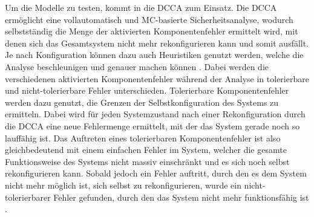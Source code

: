 Um die Modelle zu testen, kommt in \sS die \ac{DCCA} zum Einsatz. Die \ac{DCCA} ermöglicht eine vollautomatisch und \ac{MC}-basierte Sicherheitsanalyse, wodurch selbstständig die Menge der aktivierten Komponentenfehler ermittelt wird, mit denen sich das Gesamtsystem nicht mehr rekonfigurieren kann und somit ausfällt. Je nach Konfiguration können dazu auch Heuristiken genutzt werden, welche die Analyse beschleunigen und genauer machen können \cite{Eberhardinger2016}. Dabei werden die verschiedenen aktivierten Komponentenfehler während der Analyse in tolerierbare und nicht-tolerierbare Fehler unterschieden. Tolerierbare Komponentenfehler werden dazu genutzt, die Grenzen der Selbstkonfiguration des Systems zu ermitteln. Dabei wird für jeden Systemzustand nach einer Rekonfiguration durch die \ac{DCCA} eine neue Fehlermenge ermittelt, mit der das System gerade noch so lauffähig ist. Das Auftreten eines tolerierbaren Komponentenfehler ist also gleichbedeutend mit einem einfachen Fehler im System, welcher die gesamte Funktionsweise des Systems nicht massiv einschränkt und es sich noch selbst rekonfigurieren kann. Sobald jedoch ein Fehler auftritt, durch den es dem System nicht mehr möglich ist, sich selbst zu rekonfigurieren, wurde ein nicht-tolerierbarer Fehler gefunden, durch den das System nicht mehr funktionsfähig ist \cite{Habermaier2015}.